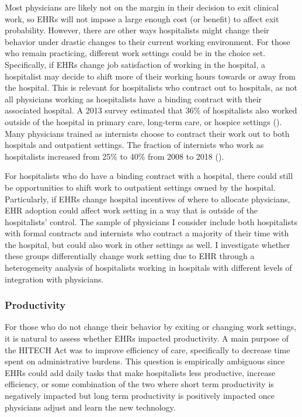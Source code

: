 \documentclass[12pt]{article}
\begin{document}
Most physicians are likely not on the margin in their decision to exit clinical work, so EHRs will not impose a large enough cost (or benefit) to affect exit probability. However, there are other ways hospitalists might change their behavior under drastic changes to their current working environment. For those who remain practicing, different work settings could be in the choice set. Specifically, if EHRs change job satisfaction of working in the hospital, a hospitalist may decide to shift more of their working hours towards or away from the hospital. This is relevant for hospitalists who contract out to hospitals, as not all physicians working as hospitalists have a binding contract with their associated hospital. A 2013 survey estimated that 36\% of hospitalists also worked outside of the hospital in primary care, long-term care, or hospice settings (\cite{Today}). Many physicians trained as internists choose to contract their work out to both hospitals and outpatient settings. The fraction of internists who work as hospitalists increased from 25\% to 40\% from 2008 to 2018 (\cite{gray2022evolving}).  

For hospitalists who do have a binding contract with a hospital, there could still be opportunities to shift work to outpatient settings owned by the hospital. Particularly, if EHRs change hospital incentives of where to allocate physicians, EHR adoption could affect work setting in a way that is outside of the hospitalists' control. The sample of physicians I consider include both hospitalists with formal contracts and internists who contract a majority of their time with the hospital, but could also work in other settings as well. I investigate whether these groups differentially change work setting due to EHR through a heterogeneity analysis of hospitalists working in hospitals with different levels of integration with physicians.


\subsubsection{Productivity}

For those who do not change their behavior by exiting or changing work settings, it is natural to assess whether EHRs impacted productivity. A main purpose of the HITECH Act was to improve efficiency of care, specifically to decrease time spent on administrative burdens. This question is empirically ambiguous since EHRs could add daily tasks that make hospitalists less productive, increase efficiency, or some combination of the two where short term productivity is negatively impacted but long term productivity is positively impacted once physicians adjust and learn the new technology. 
\end{document}
